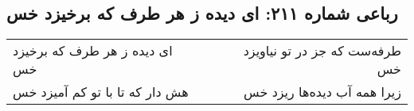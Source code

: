 \begin{center}
\section*{رباعی شماره ۲۱۱: ای دیده ز هر طرف که برخیزد خس}
\label{sec:sh211}
\begin{longtable}{l p{0.5cm} r}
ای دیده ز هر طرف که برخیزد خس
&&
طرفه‌ست که جز در تو نیاویزد خس
\\
هش دار که تا با تو کم آمیزد خس
&&
زیرا همه آب دیده‌ها ریزد خس
\\
\end{longtable}
\end{center}
